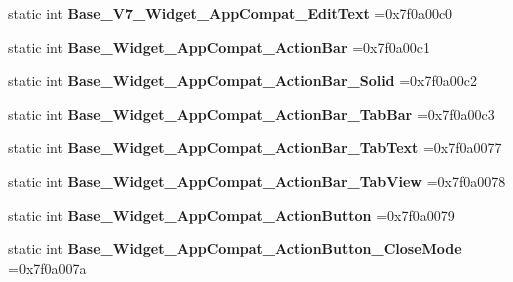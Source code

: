 \begin{DoxyCompactItemize}
static int {\bfseries Base\+\_\+\+V7\+\_\+\+Widget\+\_\+\+App\+Compat\+\_\+\+Edit\+Text} =0x7f0a00c0
\item 
\mbox{\label{classandroid_1_1support_1_1v7_1_1recyclerview_1_1R_1_1style_a427a0967865dfe0cf5870c23b205d035}} 
static int {\bfseries Base\+\_\+\+Widget\+\_\+\+App\+Compat\+\_\+\+Action\+Bar} =0x7f0a00c1
\item 
\mbox{\label{classandroid_1_1support_1_1v7_1_1recyclerview_1_1R_1_1style_af45df4b01d5fee61690a781b2368d677}} 
static int {\bfseries Base\+\_\+\+Widget\+\_\+\+App\+Compat\+\_\+\+Action\+Bar\+\_\+\+Solid} =0x7f0a00c2
\item 
\mbox{\label{classandroid_1_1support_1_1v7_1_1recyclerview_1_1R_1_1style_a0bb25e43ba411e76c0e0123c75fc5f78}} 
static int {\bfseries Base\+\_\+\+Widget\+\_\+\+App\+Compat\+\_\+\+Action\+Bar\+\_\+\+Tab\+Bar} =0x7f0a00c3
\item 
\mbox{\label{classandroid_1_1support_1_1v7_1_1recyclerview_1_1R_1_1style_ab151df8cfa75fb92b7a02b894598a4e8}} 
static int {\bfseries Base\+\_\+\+Widget\+\_\+\+App\+Compat\+\_\+\+Action\+Bar\+\_\+\+Tab\+Text} =0x7f0a0077
\item 
\mbox{\label{classandroid_1_1support_1_1v7_1_1recyclerview_1_1R_1_1style_a0c5af82dad2a142a370be327967732bb}} 
static int {\bfseries Base\+\_\+\+Widget\+\_\+\+App\+Compat\+\_\+\+Action\+Bar\+\_\+\+Tab\+View} =0x7f0a0078
\item 
\mbox{\label{classandroid_1_1support_1_1v7_1_1recyclerview_1_1R_1_1style_a1a5ae597f14254e73e49b27df0279991}} 
static int {\bfseries Base\+\_\+\+Widget\+\_\+\+App\+Compat\+\_\+\+Action\+Button} =0x7f0a0079
\item 
\mbox{\label{classandroid_1_1support_1_1v7_1_1recyclerview_1_1R_1_1style_adc591e2b4fe982f9bfcc089c97b4f800}} 
static int {\bfseries Base\+\_\+\+Widget\+\_\+\+App\+Compat\+\_\+\+Action\+Button\+\_\+\+Close\+Mode} =0x7f0a007a

\end{DoxyCompactItemize}
